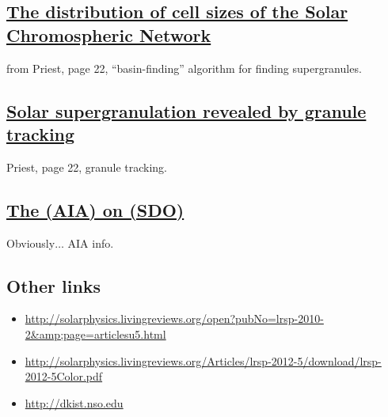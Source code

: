 \documentclass{article}
\begin{document}
\subsection{%
\href{http://cdsads.u-strasbg.fr/abs/1997ApJ...481..988H}
{The distribution of cell sizes of the Solar Chromospheric Network}}
from Priest, page 22, ``basin-finding'' algorithm for finding
supergranules.

\subsection{%
\href{http://cdsads.u-strasbg.fr/abs/2008A\%26A...479L..17R}
{Solar supergranulation revealed by granule tracking}}
Priest, page 22, granule tracking.

\subsection{%
\href{http://cdsads.u-strasbg.fr/abs/2012SoPh..275...17L}
{The (AIA) on (SDO)}}
Obviously$\ldots$ AIA info.

\subsection{Other links}
\begin{itemize}[itemsep=-1ex]
    \item \url{http://solarphysics.livingreviews.org/open?pubNo=lrsp-2010-2&amp;page=articlesu5.html}
    \item \url{http://solarphysics.livingreviews.org/Articles/lrsp-2012-5/download/lrsp-2012-5Color.pdf}
    \item \url{http://dkist.nso.edu}
\end{itemize}

%
\end{document}
